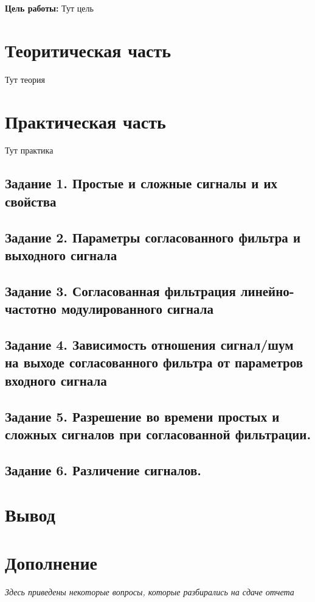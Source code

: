 



\def\labauthors{Понур К.А., Хавьер, Шиков А.П.}
\def\labgroup{450}
\def\labnumber{1}
\def\labtheme{Согласованные фильтры}


\newpage

{\bfseries Цель работы:} 
Тут цель

\section{Теоритическая часть}

Тут теория


\newpage
\section{Практическая часть}
Тут практика

\subsection{Задание 1. Простые и сложные сигналы и их свойства}


\subsection{Задание 2. Параметры согласованного фильтра и выходного сигнала}


\subsection{Задание 3. Согласованная фильтрация линейно-частотно
модулированного сигнала}


\subsection{Задание 4. Зависимость отношения сигнал/шум на выходе согласованного
фильтра от параметров входного сигнала}


\subsection{Задание 5. Разрешение во времени простых и сложных сигналов при
согласованной фильтрации.}


\subsection{Задание 6. Различение сигналов.}


\section{Вывод}


\newpage
\section{Дополнение}
\textit{Здесь приведены некоторые вопросы, которые разбирались на сдаче отчета}


